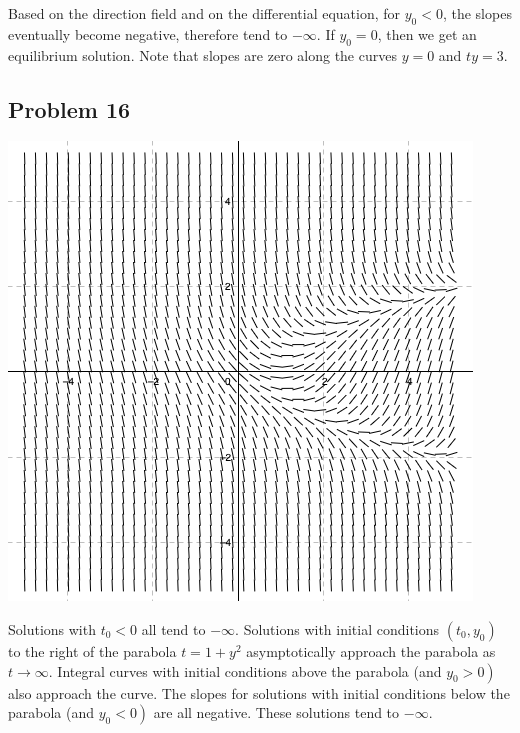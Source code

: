 \documentclass[12pt]{article}
\begin{document}
Based on the direction field and on the differential equation, for \(y_0 < 0\),
the slopes eventually become negative, therefore tend to \(-\infty\). If
\(y_0=0\), then we get an equilibrium solution. Note that slopes are zero along
the curves \(y=0\) and \(ty = 3\).

\subsection*{Problem 16}
\label{sec:org84aea3a}
\begin{center}
\includegraphics[width=.9\linewidth]{./16.png}
\end{center}

Solutions with \(t_{0}<0\) all tend to \(-\infty\). Solutions with initial
conditions \(\left(t_{0}, y_{0}\right)\) to the right of the parabola
\(t=1+y^{2}\) asymptotically approach the parabola as
\(t \rightarrow \infty\).
Integral curves with initial conditions above the parabola (and
\(\left.y_{0}>0\right)\) also approach the curve. The slopes for solutions with
initial conditions below the parabola (and \(\left.y_{0}<0\right)\) are all
negative. These solutions tend to \(-\infty\).
\end{document}
